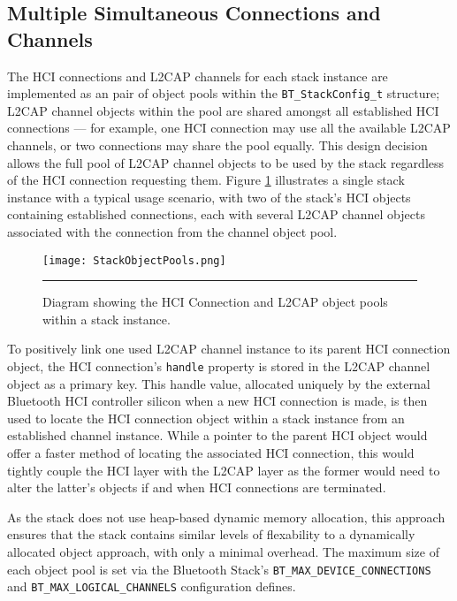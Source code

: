 

\FloatBarrier
\subsection{Multiple Simultaneous Connections and Channels}

The HCI connections and L2CAP channels for each stack instance are implemented as an pair of object pools within the \lstinline{BT_StackConfig_t} structure; L2CAP channel objects within the pool are shared amongst all established HCI connections --- for example, one HCI connection may use all the available L2CAP channels, or two connections may share the pool equally. This design decision allows the full pool of L2CAP channel objects to be used by the stack regardless of the HCI connection requesting them. Figure \ref{fig:stackobjectpools} illustrates a single stack instance with a typical usage scenario, with two of the stack's HCI objects containing established connections, each with several L2CAP channel objects associated with the connection from the channel object pool.

\begin{figure}[tbph]
	\vspace{1em}
	\centering
		\texttt{[image: StackObjectPools.png]}
	\rule{35em}{0.5pt}
	\caption[Diagram of the Bluetooth stack instance object pools]{Diagram showing the HCI Connection and L2CAP object pools within a stack instance.}
	\label{fig:stackobjectpools}
\end{figure}

To positively link one used L2CAP channel instance to its parent HCI connection object, the HCI connection's \texttt{handle} property is stored in the L2CAP channel object as a primary key. This handle value, allocated uniquely by the external Bluetooth HCI controller silicon when a new HCI connection is made, is then used to locate the HCI connection object within a stack instance from an established channel instance. While a pointer to the parent HCI object would offer a faster method of locating the associated HCI connection, this would tightly couple the HCI layer with the L2CAP layer as the former would need to alter the latter's objects if and when HCI connections are terminated.

As the stack does not use heap-based dynamic memory allocation, this approach ensures that the stack contains similar levels of flexability to a dynamically allocated object approach, with only a minimal overhead. The maximum size of each object pool is set via the Bluetooth Stack's \lstinline{BT_MAX_DEVICE_CONNECTIONS} and \lstinline{BT_MAX_LOGICAL_CHANNELS} configuration defines.

